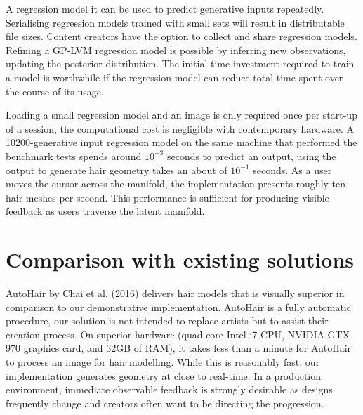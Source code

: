 \documentclass[ %
author={Dillon Keith Diep},
supervisor={Dr. Carl Henrik Ek},
degree={MEng},
title={ART-CG Hair:},
subtitle={Assisted Real-time Content Generation of Stylised Virtual Hair},
type={Research},
year={2017} ]{dissertation}
\begin{document}
A regression model it can be used to predict generative inputs repeatedly. Serialising regression models trained with small sets will result in distributable file sizes. Content creators have the option to collect and share regression models. Refining a GP-LVM regression model is possible by inferring new observations, updating the posterior distribution. The initial time investment required to train a model is worthwhile if the regression model can reduce total time spent over the course of its usage.

Loading a small regression model and an image is only required once per start-up of a session, the computational cost is negligible with contemporary hardware. A 10200-generative input regression model on the same machine that performed the benchmark tests spends around $10^{-3}$ seconds to predict an output, using the output to generate hair geometry takes an about of $10^{-1}$ seconds. As a user moves the cursor across the manifold, the implementation presents roughly ten hair meshes per second. This performance is sufficient for producing visible feedback as users traverse the latent manifold.

\section{Comparison with existing solutions}
AutoHair by Chai et al. (2016) \cite{autohair} delivers hair models that is visually superior in comparison to our demonstrative implementation. AutoHair is a fully automatic procedure, our solution is not intended to replace artists but to assist their creation process. On superior hardware (quad-core Intel i7 CPU, NVIDIA GTX 970 graphics card, and 32GB of RAM), it takes less than a minute for AutoHair to process an image for hair modelling. While this is reasonably fast, our implementation generates geometry at close to real-time. In a production environment, immediate observable feedback is strongly desirable as designs frequently change and creators often want to be directing the progression. 
\end{document}
